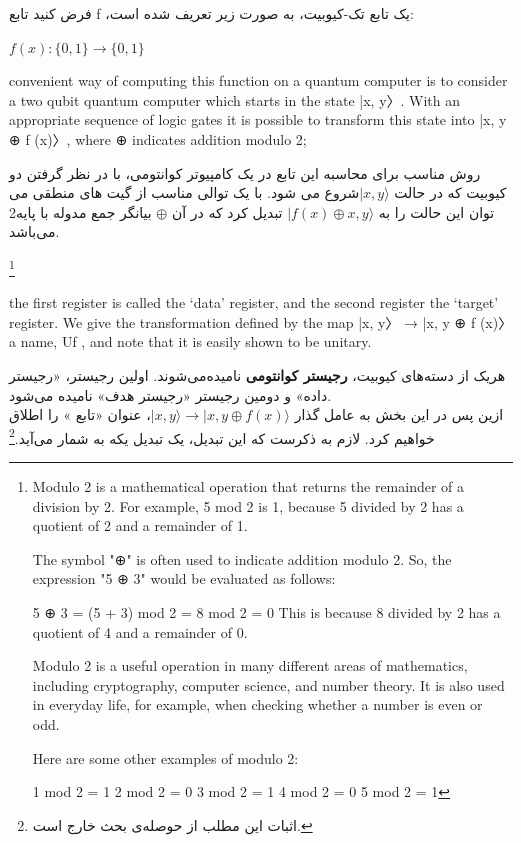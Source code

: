 \documentclass{book}
\begin{document}
فرض کنید تابع f ،یک تابع تک-کیوبیت، به صورت زیر تعریف شده است:\\
\begin{center}
	$f (x) : \{0, 1\} \rightarrow \{0, 1\}$\\
\end{center}

convenient way of computing this function on a quantum computer is to consider a two
qubit quantum computer which starts in the state |x, y〉. With an appropriate sequence
of logic gates it is possible to transform this state into |x, y ⊕ f (x)〉, where ⊕ indicates
addition modulo 2; 

روش مناسب برای محاسبه این تابع در یک کامپیوتر کوانتومی، با در نظر گرفتن دو کیوبیت که در حالت $\vert x, y\rangle$شروع می شود. با یک توالی مناسب از گیت های منطقی می توان این حالت را به $\vert f(x) \oplus x, y\rangle$ تبدیل کرد که در آن $\oplus$ بیانگر جمع مدوله با پایه‌2 می‌باشد.

\footnote{Modulo 2 is a mathematical operation that returns the remainder of a division by 2. For example, 5 mod 2 is 1, because 5 divided by 2 has a quotient of 2 and a remainder of 1.
	
	The symbol "⊕" is often used to indicate addition modulo 2. So, the expression "5 ⊕ 3" would be evaluated as follows:
	
	5 ⊕ 3 = (5 + 3) mod 2 = 8 mod 2 = 0
	This is because 8 divided by 2 has a quotient of 4 and a remainder of 0.
	
	Modulo 2 is a useful operation in many different areas of mathematics, including cryptography, computer science, and number theory. It is also used in everyday life, for example, when checking whether a number is even or odd.
	
	Here are some other examples of modulo 2:
	
	1 mod 2 = 1
	2 mod 2 = 0
	3 mod 2 = 1
	4 mod 2 = 0
	5 mod 2 = 1}




the first register is called the ‘data’ register, and the second register the
‘target’ register. We give the transformation defined by the map |x, y〉 → |x, y ⊕ f (x)〉 a
name, Uf , and note that it is easily shown to be unitary.

هریک از دسته‌های کیوبیت، \textbf{رجیستر کوانتومی} نامیده‌می‌شوند. اولین رجیستر، «رجیستر داده» و دومین رجیستر «رجیستر هدف» نامیده می‌شود.\\
ازین پس در این بخش به عامل گذار $\vert x, y \rangle \rightarrow \vert x, y \oplus f(x) \rangle$، عنوان «تابع » را اطلاق خواهیم کرد. لازم به ذکرست که این تبدیل، یک تبدیل یکه به شمار می‌آید.\footnote{اثبات این مطلب از حوصله‌ی بحث خارج است.}
\end{document}
